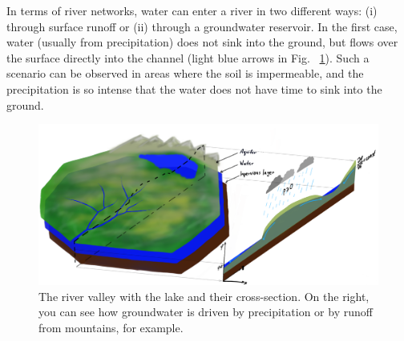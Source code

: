 \documentclass[]{pracamgr}
\begin{document}
    In terms of river networks, water can enter a river in two different ways: (i) through surface runoff or (ii) through a groundwater reservoir. In the first case, water (usually from precipitation) does not sink into the ground, but flows over the surface directly into the channel (light blue arrows in Fig. ~\ref{pow_wsiakanie}). Such a scenario can be observed in areas where the soil is impermeable, and the precipitation is so intense that the water does not have time to sink into the ground.

    \begin{figure}[H]
      \centering
      \includegraphics[width=1\textwidth]{figs/basic_river_illustration.png}
      \caption{The river valley with the lake and their cross-section. On the right, you can see how groundwater is driven by precipitation or by runoff from mountains, for example.}
      \label{pow_wsiakanie}
    \end{figure}
\end{document}
